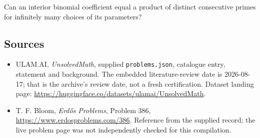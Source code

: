 \documentclass[11pt,a4paper]{article}
\begin{document}
Can an interior binomial coefficient equal a product of distinct consecutive primes for infinitely many choices of its parameters?

\subsection{Sources}

{\small

\begin{itemize}

\item[\hypertarget{source:statement:1}{S1}] ULAM.AI, \emph{UnsolvedMath}, supplied \texttt{problems.json}, catalogue entry, statement and background. The embedded literature-review date is 2026-08-17; that is the archive’s review date, not a fresh certification. Dataset landing page: \url{https://huggingface.co/datasets/ulamai/UnsolvedMath}.

\item[\hypertarget{source:statement:2}{S2}] T. F. Bloom, \emph{Erdős Problems}, Problem 386, \url{https://www.erdosproblems.com/386}. Reference from the supplied record; the live problem page was not independently checked for this compilation.

\end{itemize}

}

\label{end:statement}
\end{document}
